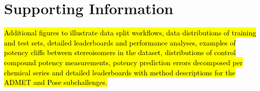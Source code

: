 \documentclass[journal=jcim,manuscript=article]{achemso}
\begin{document}
\section{Supporting Information}
\hl{Additional figures to illustrate data split workflows, data distributions of training and test sets, detailed leaderboards and performance analyses, examples of potency cliffs between stereoisomers in the dataset, distributions of control compound potency measurements, potency prediction errors decomposed per chemical series and detailed leaderboards with method descriptions for the ADMET and Pose subchallenges.}





\end{document}
